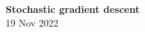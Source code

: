 \onehalfspacing


\begin{center}
  \Large{\textbf{Stochastic gradient descent}}\\

  19 Nov 2022
\end{center}
